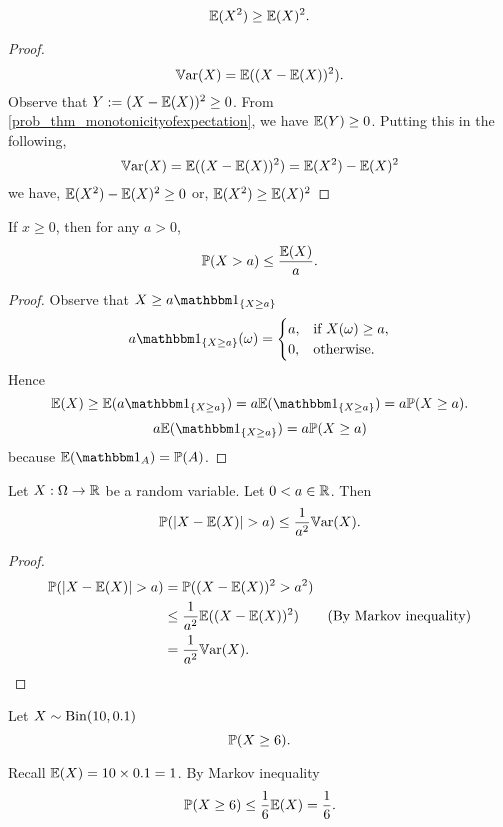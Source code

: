 \documentclass[10pt, a4paper]{article}
\begin{document}
\begin{corollary}
    \[
    \E(X ^ 2) \geq \E(X) ^ 2.
    \]
    \begin{proof}
        \[
        \Var(X) = \E((X - \E(X)) ^ 2).
        \]
        Observe that $Y := (X - \E(X)) ^ 2 \geq 0$.
        From \autoref{prob_thm_monotonicityofexpectation},
        we have $\E(Y) \geq 0$.
        Putting this in the following,
        \[
        \Var(X) = \E((X - \E(X)) ^ 2) = \E(X ^ 2) - \E(X) ^ 2
        \]
        we have,
        $\E(X ^ 2) - \E(X) ^ 2 \geq 0$ or,
        $\E(X ^ 2) \geq \E(X) ^ 2$
    \end{proof}
\end{corollary}

\begin{corollary}
    If $x \geq 0$,
    then for any $a > 0$,
    \[
    \P(X > a) \leq \frac{\E(X)}{a}.
    \]
    \begin{proof}
        Observe that $X \geq a\ind[\{X \geq a\}]$
        \[
        a\ind[\{X \geq a\}](\omega) = \begin{cases}
            a, & \text{if } X(\omega) \geq a, \\
            0, & \text{otherwise}.
        \end{cases}
        \]
        Hence
        \[
        \E(X) \geq \E(a\ind[\{X \geq a\}]) = a\E(\ind[\{X \geq a\}]) = a\P(X \geq a).
        \]
        \[
        a\E(\ind[\{X \geq a\}]) = a\P(X \geq a)
        \]
        because $\E(\ind) = \P(A)$.
    \end{proof}
\end{corollary}

\begin{corollary}\label{prob_col_chebyshevineq}
    Let $X : \Omega \rightarrow \R$ be a random variable.
    Let $0 < a \in \R$.
    Then
    \[
    \P(|X - \E(X)| > a) \leq \frac{1}{a ^ 2}\Var(X).
    \]
    \begin{proof}
        \begin{align*}
            \P(|X - \E(X)| > a) &= \P((X - \E(X)) ^ 2 > a ^ 2) \\
            &\leq \frac{1}{a ^ 2}\E((X - \E(X)) ^ 2) & \text{(By Markov inequality)} \\
            &= \frac{1}{a ^ 2}\Var(X).
        \end{align*}
    \end{proof}
\end{corollary}

\begin{example}
    Let $X \sim \Bin(10, 0.1)$
    \[
    \P(X \geq 6).
    \]

    Recall $\E(X) = 10 \times 0.1 = 1$.
    By Markov inequality
    \[
    \P(X \geq 6) \leq \frac{1}{6}\E(X) = \frac{1}{6}.
    \]
\end{example}
\end{document}
